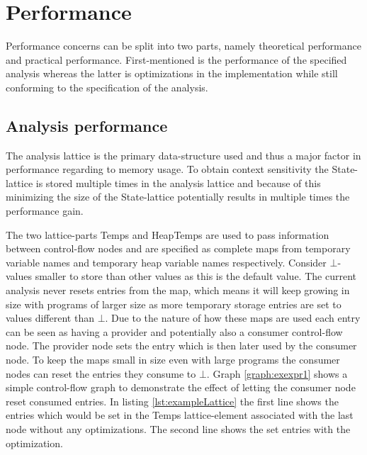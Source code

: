 \section{Performance}
\label{sec:future3}
Performance concerns can be split into two parts, namely theoretical performance and practical performance. First-mentioned is the performance of the specified analysis whereas the latter is optimizations in the implementation while still conforming to the specification of the analysis.


\subsection{Analysis performance}
The analysis lattice is the primary data-structure used and thus a major factor in performance regarding to memory usage. To obtain context sensitivity the State-lattice is stored multiple times in the analysis lattice and because of this minimizing the size of the State-lattice potentially results in multiple times the performance gain.

The two lattice-parts Temps and HeapTemps are used to pass information between control-flow nodes and are specified as complete maps from temporary variable names and temporary heap variable names respectively. Consider $\bot$-values smaller to store than other values as this is the default value. The current analysis never resets entries from the map, which means it will keep growing in size with programs of larger size as more temporary storage entries are set to values different than $\bot$. Due to the nature of how these maps are used each entry can be seen as having a provider and potentially also a consumer control-flow node. The provider node sets the entry which is then later used by the consumer node. To keep the maps small in size even with large programs the consumer nodes can reset the entries they consume to $\bot$. Graph \ref{graph:exexpr1} shows a simple control-flow graph to demonstrate the effect of letting the consumer node reset consumed entries. In listing \ref{lst:exampleLattice} the first line shows the entries which would be set in the Temps lattice-element associated with the last node without any optimizations. The second line shows the set entries with the optimization.

